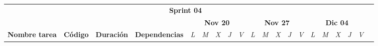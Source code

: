 \begin{longtable}[c]{llclllllllllllllllll}
        \multicolumn{19}{|c|}{\cellcolor[HTML]{305496}\textbf{Sprint 04}}                                                                                                                                                                                                                                                                                                                                                                                                                                                                                                                                                                                                                                                                                                                                                                                                                            &  \\ \cline{1-19}
        \multicolumn{1}{|c|}{}                                                                & \multicolumn{1}{c|}{}                                                          & \multicolumn{1}{c|}{}                                                            & \multicolumn{1}{c|}{}                                                                & \multicolumn{5}{c|}{\textbf{Nov 20}}                                                                                                                                    & \multicolumn{5}{c|}{\textbf{Nov 27}}                                                                                                                                    & \multicolumn{5}{c|}{\textbf{Dic 04}}                                                                                                                                                  &  \\ \cline{5-19}
        \multicolumn{1}{|c|}{\multirow{-2}{*}{\textbf{Nombre tarea}}}                         & \multicolumn{1}{c|}{\multirow{-2}{*}{\textbf{Código}}}                         & \multicolumn{1}{c|}{\multirow{-2}{*}{\textbf{Duración}}}                         & \multicolumn{1}{c|}{\multirow{-2}{*}{\textbf{Dependencias}}}                         & \multicolumn{1}{l|}{\textit{L}} & \multicolumn{1}{l|}{\textit{M}} & \multicolumn{1}{l|}{\textit{X}} & \multicolumn{1}{l|}{\textit{J}} & \multicolumn{1}{l|}{\textit{V}} & \multicolumn{1}{l|}{\textit{L}} & \multicolumn{1}{l|}{\textit{M}} & \multicolumn{1}{l|}{\textit{X}} & \multicolumn{1}{l|}{\textit{J}} & \multicolumn{1}{l|}{\textit{V}} & \multicolumn{1}{l|}{\textit{L}} & \multicolumn{1}{l|}{\textit{M}} & \multicolumn{1}{l|}{\textit{X}} & \multicolumn{1}{l|}{\textit{J}} & \multicolumn{1}{l|}{\textit{V}}               &  \\ \cline{1-19}

\end{longtable}
